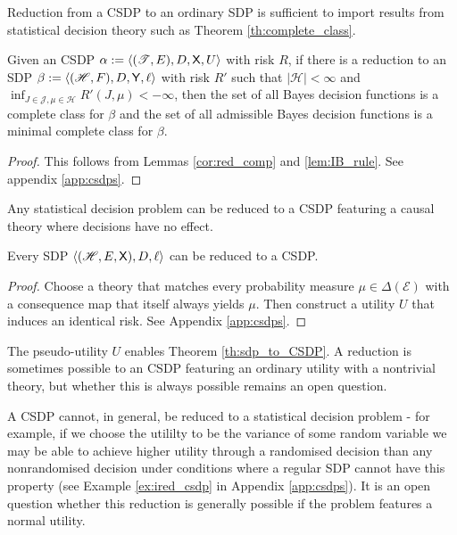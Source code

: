 
Reduction from a CSDP to an ordinary SDP is sufficient to import results from statistical decision theory such as Theorem \ref{th:complete_class}.


\begin{theorem}\label{th:complete_class}
Given an CSDP $\alpha:=\langle (\mathscr{T},E),D,\mathsf{X},U\rangle$ with risk $R$, if there is a reduction to an SDP $\beta:=\langle (\mathscr{H},F),D,\mathsf{Y},\ell \rangle$ with risk $R'$ such that $|\mathscr{H}|<\infty$ and $\inf_{J\in\mathscr{J},\mu\in\mathscr{H}} R'(J,\mu)<-\infty$, then the set of all Bayes decision functions is a complete class for $\beta$ and the set of all admissible Bayes decision functions is a minimal complete class for $\beta$.
\end{theorem}

\begin{proof}
This follows from Lemmas \ref{cor:red_comp} and \ref{lem:IB_rule}. See appendix \ref{app:csdps}.
\end{proof}

Any statistical decision problem can be reduced to a CSDP featuring a causal theory where decisions have no effect.



\begin{theorem}\label{th:sdp_to_CSDP}
Every SDP $\langle (\mathscr{H},E,\mathsf{X}),D,\ell\rangle$ can be reduced to a CSDP.
\end{theorem}
\begin{proof}
Choose a theory that matches every probability measure $\mu\in\Delta(\mathcal{E})$ with a consequence map that itself always yields $\mu$. Then construct a utility $U$ that induces an identical risk. See Appendix \ref{app:csdps}.
\end{proof}

The pseudo-utility $U$ enables Theorem \ref{th:sdp_to_CSDP}. A reduction is sometimes possible to an CSDP featuring an ordinary utility with a nontrivial theory, but whether this is always possible remains an open question.

A CSDP cannot, in general, be reduced to a statistical decision problem - for example, if we choose the utililty to be the variance of some random variable we may be able to achieve higher utility through a randomised decision than any nonrandomised decision under conditions where a regular SDP cannot have this property (see Example \ref{ex:ired_csdp} in Appendix \ref{app:csdps}). It is an open question whether this reduction is generally possible if the problem features a normal utility.

